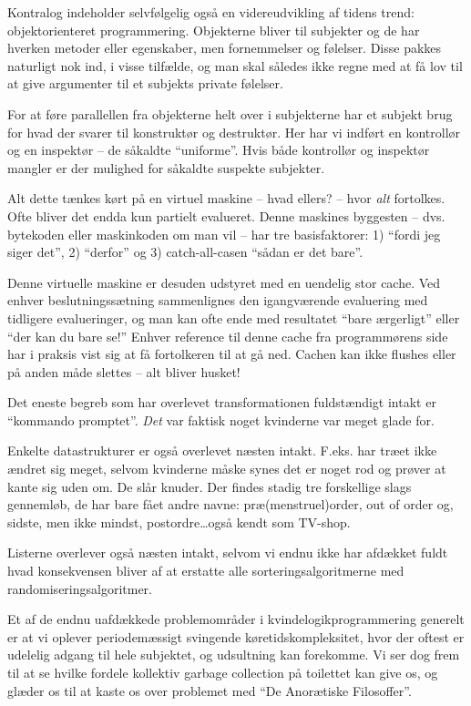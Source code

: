 \documentclass[danish]{article}
\begin{document}
\begin{sketch}
 Kontralog indeholder selvfølgelig også en videreudvikling af tidens
trend: objektorienteret programmering. Objekterne bliver til subjekter og de har
hverken metoder eller egenskaber, men fornemmelser og følelser. Disse pakkes
naturligt nok ind, i visse tilfælde, og man skal således ikke regne med at få lov
til at give argumenter til et subjekts private følelser.

 For at føre parallellen fra objekterne helt over i subjekterne har et
subjekt brug for hvad der svarer til konstruktør og destruktør. Her har vi
indført en kontrollør og en inspektør -- de såkaldte ``uniforme''. Hvis både
kontrollør og inspektør mangler er der mulighed for såkaldte suspekte subjekter.

 Alt dette tænkes kørt på en virtuel maskine -- hvad ellers? -- hvor
\emph{alt} fortolkes. Ofte bliver det endda kun partielt evalueret. Denne
maskines byggesten -- dvs. bytekoden eller maskinkoden om man vil -- har tre
basisfaktorer: 1) ``fordi jeg siger det'', 2) ``derfor'' og 3) catch-all-casen
``sådan er det bare''.

 Denne virtuelle maskine er desuden udstyret med en uendelig stor cache.
Ved enhver beslutnings\-sætning sammenlignes den igangværende evaluering med
tidligere evalueringer, og man kan ofte ende med resultatet ``bare ærgerligt''
eller ``der kan du bare se!'' Enhver reference til denne cache fra programmørens
side har i praksis vist sig at få fortolkeren til at gå ned. Cachen kan ikke
flushes eller på anden måde slettes -- alt bliver husket!

 Det eneste begreb som har overlevet transformationen fuldstændigt
intakt er ``kommando promptet''. \emph{Det} var faktisk noget kvinderne var
meget glade for.

 Enkelte datastrukturer er også overlevet næsten intakt. F.eks. har
træet ikke ændret sig meget, selvom kvinderne måske synes det er noget rod og
prøver at kante sig uden om. De slår knuder. Der findes stadig tre forskellige
slags gennemløb, de har bare fået andre navne: præ(menstruel)order, out of order
og, sidste, men ikke mindst, postordre\ldots også kendt som TV-shop.

 Listerne overlever også næsten intakt, selvom vi endnu ikke har
afdækket fuldt hvad konsekvensen bliver af at erstatte alle
sorteringsalgoritmerne med randomiseringsalgoritmer.

 Et af de endnu uafdækkede problemområder i kvindelogikprogrammering
generelt er at vi oplever periodemæssigt svingende køretidskompleksitet, hvor
der oftest er udelelig adgang til hele subjektet, og udsultning kan forekomme.
Vi ser dog frem til at se hvilke fordele kollektiv garbage collection på
toilettet kan give os, og glæder os til at kaste os over problemet med ``De
Anorætiske Filosoffer''.


\end{sketch}
\end{document}
